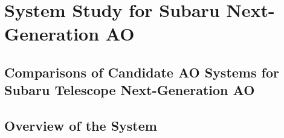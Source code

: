 


\def\thisdir{development/design/}

%

\chapter{System Study for Subaru Next-Generation AO
\label{chap:system_design}}

\section{Comparisons of Candidate AO Systems for Subaru Telescope
 Next-Generation AO
\label{sec:various_ao_systems}}


\section{Overview of the System}


